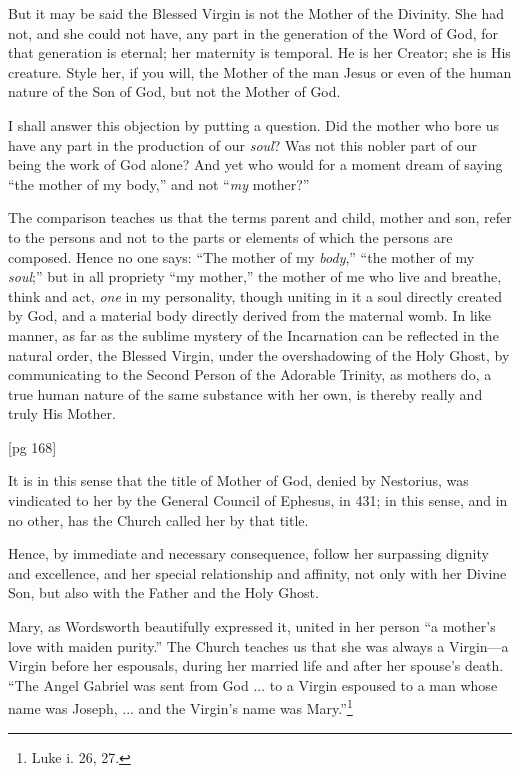 But it may be said the Blessed Virgin is not
the Mother of the Divinity. She had not, and she
could not have, any part in the generation of the
Word of God, for that generation is eternal; her
maternity is temporal. He is her Creator; she
is His creature. Style her, if you will, the Mother
of the man Jesus or even of the human nature of
the Son of God, but not the Mother of God.

I shall answer this objection by putting a question.
Did the mother who bore us have any part
in the production of our \emph{soul}? Was not this
nobler part of our being the work of God alone?
And yet who would for a moment dream of saying
“the mother of my body,” and not “\emph{my}
mother?”

The comparison teaches us that the terms parent
and child, mother and son, refer to the persons
and not to the parts or elements of which the persons
are composed. Hence no one says: “The
mother of my \emph{body},” “the mother of my \emph{soul};”
but in all propriety “my mother,” the mother of
me who live and breathe, think and act, \emph{one} in my
personality, though uniting in it a soul directly
created by God, and a material body directly derived
from the maternal womb. In like manner,
as far as the sublime mystery of the Incarnation
can be reflected in the natural order, the Blessed
Virgin, under the overshadowing of the Holy
Ghost, by communicating to the Second Person of
the Adorable Trinity, as mothers do, a true
human nature of the same substance with her
own, is thereby really and truly His Mother.

[pg 168]

It is in this sense that the title of Mother of
God, denied by Nestorius, was vindicated to her
by the General Council of Ephesus, in 431; in
this sense, and in no other, has the Church called
her by that title.

Hence, by immediate and necessary consequence,
follow her surpassing dignity and excellence, and
her special relationship and affinity, not only with
her Divine Son, but also with the Father and
the Holy Ghost.

Mary, as Wordsworth beautifully expressed it,
united in her person “a mother's love with maiden
purity.” The Church teaches us that she was always
a Virgin—a Virgin before her espousals,
during her married life and after her spouse's
death. “The Angel Gabriel was sent from God ...
to a Virgin espoused to a man whose name
was Joseph, ... and the Virgin's name was
Mary.”\footnote{Luke i. 26, 27.}

